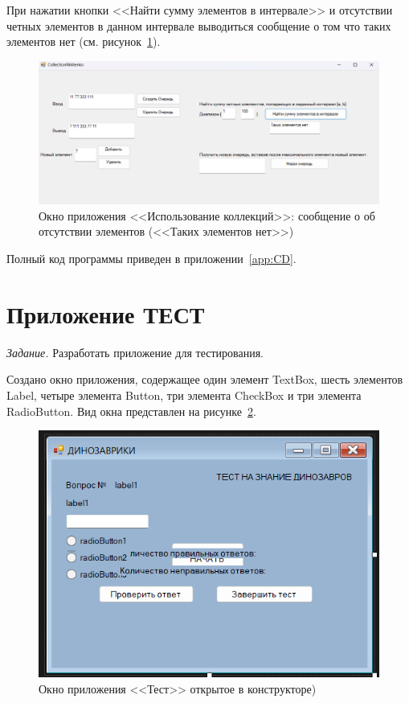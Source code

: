 \documentclass[bachelor, och, pract, times]{SCWorks}
\begin{document}
При нажатии кнопки <<Найти сумму элементов в интервале>> и отсутствии четных элементов в данном интервале выводиться сообщение о том что таких элементов нет (см. рисунок~\ref{fig:queue-07}).

\begin{figure}[H]
    \centering
    \includegraphics[scale=0.5]{Скрины/Снимок экрана 2025-01-05 212905.png}
    \caption{Окно приложения <<Использование коллекций>>: сообщение о об отсутствии элементов (<<Таких элементов нет>>)}\label{fig:queue-07}
\end{figure}


Полный код программы приведен в приложении~\ref{app:CD}.

\section{Приложение ТЕСТ}

\textsl{Задание.} Разработать приложение для тестирования.

Создано окно приложения, содержащее один элемент TextBox, шесть элементов Label, четыре элемента Button, три элемента CheckBox и три элемента RadioButton. Вид окна представлен на рисунке~\ref{fig:test-01}.

\begin{figure}[H]
    \centering
    \includegraphics[scale=0.7]{Скрины/Снимок экрана 2025-01-05 213031.png}
    \caption{Окно приложения <<Тест>> открытое в конструкторе)}\label{fig:test-01}
\end{figure}
\end{document}

